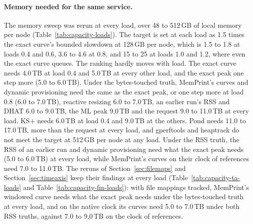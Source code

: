 \documentclass[11pt]{article}
\newcommand{\memprint}{MemPrint}
\newcommand{\secref}[1]{Section~\ref{#1}}
\newcommand{\tabref}[1]{Table~\ref{#1}}
\begin{document}
\paragraph{Memory needed for the same service.} The memory sweep was rerun at every load, over 48 to 512\,GB of
local memory per node (\tabref{tab:capacity-loads}). The target is set at each load as 1.5 times the exact
curve's bounded slowdown at 128\,GB per node, which is 1.5 to 1.8 at loads 0.4 and 0.6, 3.6 to 4.6 at 0.8, and
15 to 25 at loads 1.0 and 1.2, where even the exact curve queues. The ranking hardly moves with load. The exact
curve needs 4.0\,TB at load 0.4 and 5.0\,TB at every other load, and the exact peak one step more (5.0 to
6.0\,TB). Under the bytes-touched truth, \memprint{}'s curves and dynamic provisioning need the same as the exact
peak, or one step more at load 0.8 (6.0 to 7.0\,TB), reactive resizing 6.0 to 7.0\,TB, an earlier run's RSS and
DHAT 6.0 to 9.0\,TB, the ML peak 9.0\,TB and the request 9.0 to 11.0\,TB at every load. KS+ needs 6.0\,TB at load 0.4 and 9.0\,TB at the
others. Pond needs 11.0 to 17.0\,TB, more than the request at every load, and gperftools and heaptrack do not meet the target at 512\,GB per
node at any load. Under the RSS truth, the RSS of an earlier run and dynamic provisioning need what the exact peak
needs (5.0 to 6.0\,TB) at every load, while \memprint{}'s curves on their clock of references need 7.0 to 11.0\,TB.
The reruns of \secref{sec:filemaps} and \secref{sec:timeaxis} keep their findings at every load
(\tabref{tab:capacity-ta-loads} and \tabref{tab:capacity-fm-loads}): with file mappings tracked, \memprint{}'s
windowed curve needs what the exact peak needs under the bytes-touched truth at every load, and on the native
clock its curves need 5.0 to 7.0\,TB under both RSS truths, against 7.0 to 9.0\,TB on the clock of references.
\end{document}
